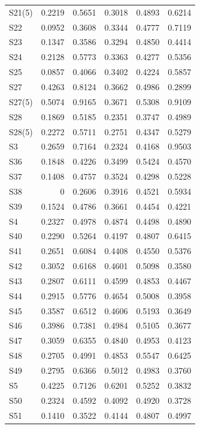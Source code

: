 \begin{longtable}{lrrrrr}
  S21(5) & 0.2219 & 0.5651 & 0.3018 & 0.4893 & 0.6214 \\
  S22 & 0.0952 & 0.3608 & 0.3344 & 0.4777 & 0.7119 \\
  S23 & 0.1347 & 0.3586 & 0.3294 & 0.4850 & 0.4414 \\
  S24 & 0.2128 & 0.5773 & 0.3363 & 0.4277 & 0.5356 \\
  S25 & 0.0857 & 0.4066 & 0.3402 & 0.4224 & 0.5857 \\
  S27 & 0.4263 & 0.8124 & 0.3662 & 0.4986 & 0.2899 \\
  S27(5) & 0.5074 & 0.9165 & 0.3671 & 0.5308 & 0.9109 \\
  S28 & 0.1869 & 0.5185 & 0.2351 & 0.3747 & 0.4989 \\
  S28(5) & 0.2272 & 0.5711 & 0.2751 & 0.4347 & 0.5279 \\
  S3 & 0.2659 & 0.7164 & 0.2324 & 0.4168 & 0.9503 \\
  S36 & 0.1848 & 0.4226 & 0.3499 & 0.5424 & 0.4570 \\
  S37 & 0.1408 & 0.4757 & 0.3524 & 0.4298 & 0.5228 \\
  S38 & 0 & 0.2606 & 0.3916 & 0.4521 & 0.5934 \\
  S39 & 0.1524 & 0.4786 & 0.3661 & 0.4454 & 0.4221 \\
  S4 & 0.2327 & 0.4978 & 0.4874 & 0.4498 & 0.4890 \\
  S40 & 0.2290 & 0.5264 & 0.4197 & 0.4807 & 0.6415 \\
  S41 & 0.2651 & 0.6084 & 0.4408 & 0.4550 & 0.5376 \\
  S42 & 0.3052 & 0.6168 & 0.4601 & 0.5098 & 0.3580 \\
  S43 & 0.2807 & 0.6111 & 0.4599 & 0.4853 & 0.4467 \\
  S44 & 0.2915 & 0.5776 & 0.4654 & 0.5008 & 0.3958 \\
  S45 & 0.3587 & 0.6512 & 0.4606 & 0.5193 & 0.3649 \\
  S46 & 0.3986 & 0.7381 & 0.4984 & 0.5105 & 0.3677 \\
  S47 & 0.3059 & 0.6355 & 0.4840 & 0.4953 & 0.4123 \\
  S48 & 0.2705 & 0.4991 & 0.4853 & 0.5547 & 0.6425 \\
  S49 & 0.2795 & 0.6366 & 0.5012 & 0.4983 & 0.3760 \\
  S5 & 0.4225 & 0.7126 & 0.6201 & 0.5252 & 0.3832 \\
  S50 & 0.2324 & 0.4592 & 0.4092 & 0.4920 & 0.3728 \\
  S51 & 0.1410 & 0.3522 & 0.4144 & 0.4807 & 0.4997 \\

\end{longtable}
